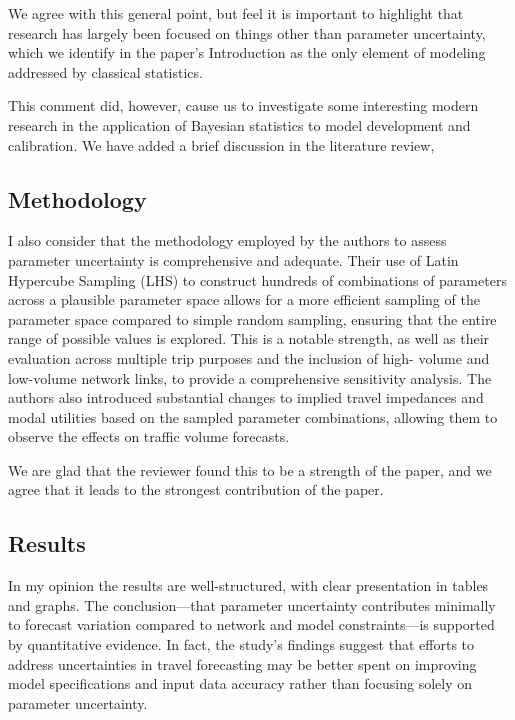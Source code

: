 \documentclass{ar2rc}
\begin{document}
\AR We agree with this general point, but feel it is important to highlight that research 
has largely been focused on things other than parameter uncertainty, which we identify in 
the paper's Introduction as the only element of modeling addressed by classical statistics.

This comment did, however, cause us to investigate some interesting modern research in the 
application of Bayesian statistics to model development and calibration. We have added a brief
discussion in the literature review,

\begin{quote}

\end{quote}

\subsection{Methodology}
\RC I also consider that the methodology employed by the authors to assess parameter
uncertainty is comprehensive and adequate. Their use of Latin Hypercube Sampling (LHS)
to construct hundreds of combinations of parameters across a plausible parameter space
allows for a more efficient sampling of the parameter space compared to simple random
sampling, ensuring that the entire range of possible values is explored. This is a notable
strength, as well as their evaluation across multiple trip purposes and the inclusion of high-
volume and low-volume network links, to provide a comprehensive sensitivity analysis. The
authors also introduced substantial changes to implied travel impedances and modal
utilities based on the sampled parameter combinations, allowing them to observe the
effects on traffic volume forecasts.

\AR We are glad that the reviewer found this to be a strength of the paper, and we agree that 
it leads to the strongest contribution of the paper.


\subsection{Results}
\RC In my opinion the results are well-structured, with clear presentation in tables and graphs.
The conclusion—that parameter uncertainty contributes minimally to forecast variation
compared to network and model constraints—is supported by quantitative evidence. In
fact, the study's findings suggest that efforts to address uncertainties in travel forecasting
may be better spent on improving model specifications and input data accuracy rather than
focusing solely on parameter uncertainty.
\end{document}
